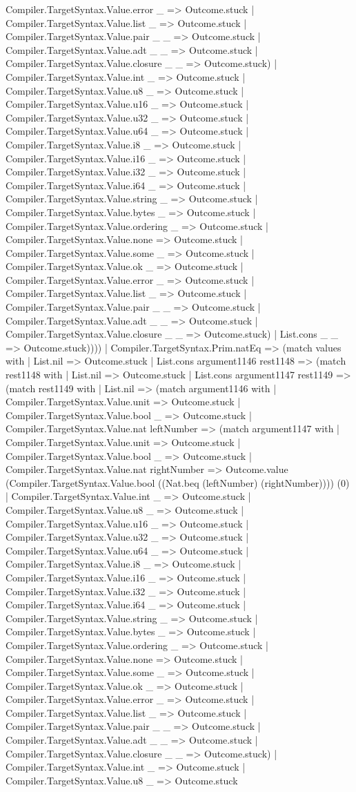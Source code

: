 \documentclass[11pt]{article}
\begin{document}
Compiler.TargetSyntax.Value.error \_ => Outcome.stuck | Compiler.TargetSyntax.Value.list \_ => Outcome.stuck | Compiler.TargetSyntax.Value.pair \_ \_ => Outcome.stuck | Compiler.TargetSyntax.Value.adt \_ \_ => Outcome.stuck | Compiler.TargetSyntax.Value.closure \_ \_ => Outcome.stuck) | Compiler.TargetSyntax.Value.int \_ => Outcome.stuck | Compiler.TargetSyntax.Value.u8 \_ => Outcome.stuck | Compiler.TargetSyntax.Value.u16 \_ => Outcome.stuck | Compiler.TargetSyntax.Value.u32 \_ => Outcome.stuck | Compiler.TargetSyntax.Value.u64 \_ => Outcome.stuck | Compiler.TargetSyntax.Value.i8 \_ => Outcome.stuck | Compiler.TargetSyntax.Value.i16 \_ => Outcome.stuck | Compiler.TargetSyntax.Value.i32 \_ => Outcome.stuck | Compiler.TargetSyntax.Value.i64 \_ => Outcome.stuck | Compiler.TargetSyntax.Value.string \_ => Outcome.stuck | Compiler.TargetSyntax.Value.bytes \_ => Outcome.stuck | Compiler.TargetSyntax.Value.ordering \_ => Outcome.stuck | Compiler.TargetSyntax.Value.none => Outcome.stuck | Compiler.TargetSyntax.Value.some \_ => Outcome.stuck | Compiler.TargetSyntax.Value.ok \_ => Outcome.stuck | Compiler.TargetSyntax.Value.error \_ => Outcome.stuck | Compiler.TargetSyntax.Value.list \_ => Outcome.stuck | Compiler.TargetSyntax.Value.pair \_ \_ => Outcome.stuck | Compiler.TargetSyntax.Value.adt \_ \_ => Outcome.stuck | Compiler.TargetSyntax.Value.closure \_ \_ => Outcome.stuck) | List.cons \_ \_ => Outcome.stuck)))) | Compiler.TargetSyntax.Prim.natEq => (match values with | List.nil => Outcome.stuck | List.cons argument1146 rest1148 => (match rest1148 with | List.nil => Outcome.stuck | List.cons argument1147 rest1149 => (match rest1149 with | List.nil => (match argument1146 with | Compiler.TargetSyntax.Value.unit => Outcome.stuck | Compiler.TargetSyntax.Value.bool \_ => Outcome.stuck | Compiler.TargetSyntax.Value.nat leftNumber => (match argument1147 with | Compiler.TargetSyntax.Value.unit => Outcome.stuck | Compiler.TargetSyntax.Value.bool \_ => Outcome.stuck | Compiler.TargetSyntax.Value.nat rightNumber => Outcome.value (Compiler.TargetSyntax.Value.bool ((Nat.beq (leftNumber) (rightNumber)))) (0) | Compiler.TargetSyntax.Value.int \_ => Outcome.stuck | Compiler.TargetSyntax.Value.u8 \_ => Outcome.stuck | Compiler.TargetSyntax.Value.u16 \_ => Outcome.stuck | Compiler.TargetSyntax.Value.u32 \_ => Outcome.stuck | Compiler.TargetSyntax.Value.u64 \_ => Outcome.stuck | Compiler.TargetSyntax.Value.i8 \_ => Outcome.stuck | Compiler.TargetSyntax.Value.i16 \_ => Outcome.stuck | Compiler.TargetSyntax.Value.i32 \_ => Outcome.stuck | Compiler.TargetSyntax.Value.i64 \_ => Outcome.stuck | Compiler.TargetSyntax.Value.string \_ => Outcome.stuck | Compiler.TargetSyntax.Value.bytes \_ => Outcome.stuck | Compiler.TargetSyntax.Value.ordering \_ => Outcome.stuck | Compiler.TargetSyntax.Value.none => Outcome.stuck | Compiler.TargetSyntax.Value.some \_ => Outcome.stuck | Compiler.TargetSyntax.Value.ok \_ => Outcome.stuck | Compiler.TargetSyntax.Value.error \_ => Outcome.stuck | Compiler.TargetSyntax.Value.list \_ => Outcome.stuck | Compiler.TargetSyntax.Value.pair \_ \_ => Outcome.stuck | Compiler.TargetSyntax.Value.adt \_ \_ => Outcome.stuck | Compiler.TargetSyntax.Value.closure \_ \_ => Outcome.stuck) | Compiler.TargetSyntax.Value.int \_ => Outcome.stuck | Compiler.TargetSyntax.Value.u8 \_ => Outcome.stuck 
\end{document}

